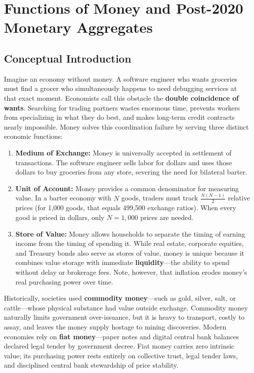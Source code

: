 \documentclass[11pt, oneside]{book}
\begin{document}
\section{Functions of Money and Post-2020 Monetary Aggregates}

\subsection*{Conceptual Introduction}

Imagine an economy without money. A software engineer who wants groceries must find a grocer who simultaneously happens to need debugging services at that exact moment. Economists call this obstacle the \textbf{double coincidence of wants}. Searching for trading partners wastes enormous time, prevents workers from specializing in what they do best, and makes long-term credit contracts nearly impossible. Money solves this coordination failure by serving three distinct economic functions:

\begin{enumerate}[leftmargin=1.5em, itemsep=4pt]
  \item \textbf{Medium of Exchange:} Money is universally accepted in settlement of transactions. The software engineer sells labor for dollars and uses those dollars to buy groceries from any store, severing the need for bilateral barter.
  \item \textbf{Unit of Account:} Money provides a common denominator for measuring value. In a barter economy with $N$ goods, traders must track $\frac{N(N-1)}{2}$ relative prices (for 1,000 goods, that equals 499,500 exchange ratios). When every good is priced in dollars, only $N = 1,000$ prices are needed.
  \item \textbf{Store of Value:} Money allows households to separate the timing of earning income from the timing of spending it. While real estate, corporate equities, and Treasury bonds also serve as stores of value, money is unique because it combines value storage with immediate \textbf{liquidity}—the ability to spend without delay or brokerage fees. Note, however, that inflation erodes money's real purchasing power over time.
\end{enumerate}

Historically, societies used \textbf{commodity money}—such as gold, silver, salt, or cattle—whose physical substance had value outside exchange. Commodity money naturally limits government over-issuance, but it is heavy to transport, costly to assay, and leaves the money supply hostage to mining discoveries. Modern economies rely on \textbf{fiat money}—paper notes and digital central bank balances declared legal tender by government decree. Fiat money carries zero intrinsic value; its purchasing power rests entirely on collective trust, legal tender laws, and disciplined central bank stewardship of price stability.
\end{document}
